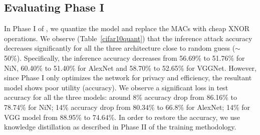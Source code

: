 



\subsection{Evaluating Phase I}
\label{evalPh1}

In Phase I of \method, we quantize the model and replace the MACs with cheap XNOR operations.
We observe (Table~\ref{cifar10quant}) that the inference attack accuracy decreases significantly for all the three architecture close to random guess ($\sim$50\%).
Specifically, the inference accuracy decreases from 56.69\% to 51.76\% for NiN, 60.40\% to 51.40\% for AlexNet and 58.70\% to 52.65\% for VGGNet.
%
However, since Phase I only optimizes the network for privacy and efficiency, the resultant model shows poor utility (accuracy).
We observe a significant loss in test accuracy for all the three models: around 8\% accuracy drop from 86.16\% to 78.74\% for NiN; 14\% accuracy drop from 80.34\% to 66.8\% for AlexNet; 14\% for VGG model from 88.95\% to 74.64\%.
In order to restore the accuracy, we use knowledge distillation as described in Phase II of the \method\hspace{0.02in} training methodology.

